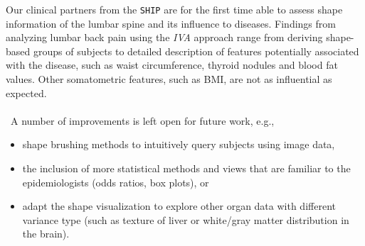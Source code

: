 \documentclass[journal]{style/vgtc} 			          %
\begin{document}
Our clinical partners from the \texttt{SHIP} are for the first time able to assess shape information of the lumbar spine and its influence to diseases.
%
Findings from analyzing lumbar back pain using the \emph{IVA} approach range from deriving shape-based groups of subjects to detailed description of features potentially associated with the disease, such as waist circumference, thyroid nodules and blood fat values.
%
Other somatometric features, such as BMI, are not as influential as expected.
%
\\\\\
A number of improvements is left open for future work, e.g.,
\begin{itemize}
	\item shape brushing methods to intuitively query subjects using image data,
	\item the inclusion of more statistical methods and views that are familiar to the epidemiologists (odds ratios, box plots), or
	\item adapt the shape visualization to explore other organ data with different variance type (such as texture of liver or white/gray matter distribution in the brain).
\end{itemize}
\end{document}
